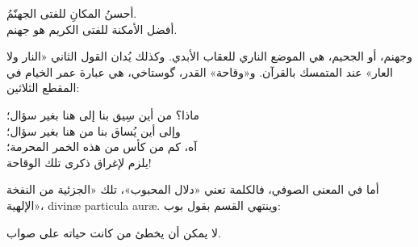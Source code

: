 \begin{SourceQuotation}
أحسنُ المكانِ للفتى الجهنّمُ.\\
أفضل الأمكنة للفتى الكريم هو جهنم.
\end{SourceQuotation}

وجهنم، أو الجحيم، هي الموضع الناري للعقاب الأبدي. وكذلك يُدان القول الثاني «النار ولا العار» عند المتمسك بالقرآن. و«وقاحة» القدر، گوستاخي، هي عبارة عمر الخيام في المقطع الثلاثين:

\begin{SourceQuotation}
ماذا؟ من أين سِيق بنا إلى هنا بغير سؤال؛\\
وإلى أين يُساق بنا من هنا بغير سؤال؛\\
آه، كم من كأس من هذه الخمر المحرمة؛\\
يلزم لإغراق ذكرى تلك الوقاحة!
\end{SourceQuotation}

أما في المعنى الصوفي، فالكلمة تعني «دلال المحبوب»، تلك «الجزئية من النفخة الإلهية»، \textenglish{divinæ particula auræ}. وينتهي القسم بقول بوب:

\begin{SourceQuotation}
لا يمكن أن يخطئ من كانت حياته على صواب.
\end{SourceQuotation}
